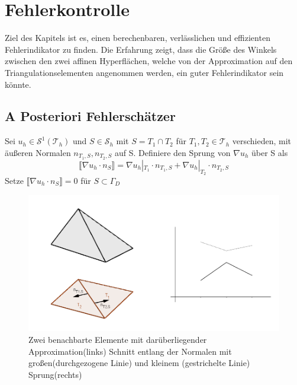 \chapter{Fehlerkontrolle}
Ziel des Kapitels ist es, einen berechenbaren, verlässlichen und effizienten Fehlerindikator zu finden. Die Erfahrung zeigt, dass die Größe des Winkels zwischen den zwei affinen Hyperflächen, welche von der Approximation auf den Triangulationselementen angenommen werden, ein guter Fehlerindikator sein könnte. 

\section{A Posteriori Fehlerschätzer}
\begin{definition}[Sprung]
	Sei $u_h\in\mathscr{S}^1(\mathscr{T}_h)$ und $S\in\mathscr{S}_h$ mit $S=T_1 \cap T_2$ für $T_1,T_2 \in \mathscr{T}_h$ verschieden, mit äußeren Normalen $n_{T_1,S},n_{T_2,S}$ auf S. Definiere den Sprung von $\nabla u_h$ über S als
	\[
	\llbracket \nabla u_h \cdot n_S\rrbracket = \nabla u_h|_{T_1} \cdot n_{T_1,S} + \nabla u_h|_{T_2} \cdot n_{T_2,S}
	\]
	Setze $\llbracket \nabla u_h \cdot n_S\rrbracket = 0$ f\"ur $S\subset \Gamma_D$
\end{definition} 

\begin{figure}[!htbp]
	\begin{center}
		\includegraphics[width=16cm]{pics/Sprung.png}
	\end{center}
	\caption{Zwei benachbarte Elemente mit darüberliegender Approximation(links) Schnitt entlang der Normalen mit großen(durchgezogene Linie) und kleinem (gestrichelte Linie) Sprung(rechts)}
\end{figure}


